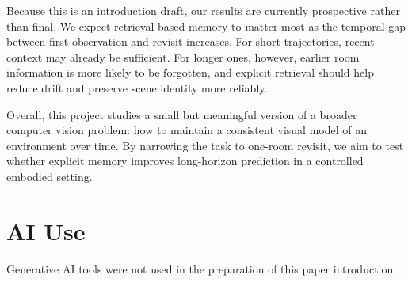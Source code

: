 \documentclass[10pt,twocolumn,letterpaper]{article}
\begin{document}
Because this is an introduction draft, our results are currently prospective
rather than final. We expect retrieval-based memory to matter most as the
temporal gap between first observation and revisit increases. For short
trajectories, recent context may already be sufficient. For longer ones,
however, earlier room information is more likely to be forgotten, and explicit
retrieval should help reduce drift and preserve scene identity more reliably.

Overall, this project studies a small but meaningful version of a broader
computer vision problem: how to maintain a consistent visual model of an
environment over time. By narrowing the task to one-room revisit, we aim to test
whether explicit memory improves long-horizon prediction in a controlled
embodied setting.

\section{AI Use}
Generative AI tools were not used in the preparation of this paper introduction.
\end{document}
